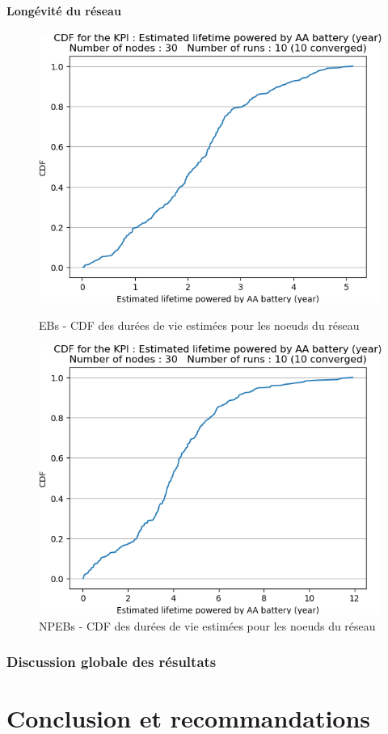 \documentclass[]{report}
\begin{document}
\subsubsection{Longévité du réseau}

\begin{figure}[!ht]
	\begin{minipage}{0.49\textwidth}
		\centering
		\includegraphics[width=\textwidth]{results/EB/lifetime_AA_years.cdf}
		\caption{EBs - CDF des durées de vie estimées pour les noeuds du réseau}
		\label{fig:EBlifetime}
	\end{minipage}\hfill
	\begin{minipage}{0.5\textwidth}
		\centering
		\includegraphics[width=\textwidth]{results/NPEB/lifetime_AA_years.cdf}
		\caption{NPEBs - CDF des durées de vie estimées pour les noeuds du réseau}
		\label{fig:NPEBlifetime}
	\end{minipage}	
\end{figure}

\subsection{Discussion globale des résultats} 




\chapter*{Conclusion et recommandations}





\end{document}
